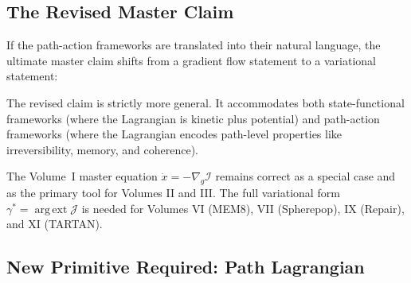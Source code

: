 \documentclass[11pt, a4paper]{article}
\begin{document}
\subsection{The Revised Master Claim}

If the path-action frameworks are translated into their natural language,
the ultimate master claim shifts from a gradient flow statement to a
variational statement:

\medskip
\begin{center}
\end{center}

\medskip
The revised claim is strictly more general. It accommodates both
state-functional frameworks (where the Lagrangian is kinetic plus
potential) and path-action frameworks (where the Lagrangian encodes
path-level properties like irreversibility, memory, and coherence).

The Volume~I master equation $\dot{x} = -\nabla_g \mathcal{I}$ remains
correct as a special case and as the primary tool for Volumes II and III.
The full variational form $\gamma^* = \operatorname{arg\,ext}\mathcal{J}$
is needed for Volumes VI (MEM\textbar{}8), VII (Spherepop), IX (Repair),
and XI (TARTAN).

\subsection{New Primitive Required: Path Lagrangian}
\end{document}
